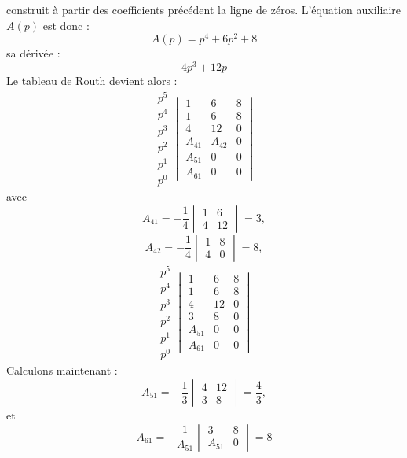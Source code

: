 construit à partir des coefficients précédent la ligne de zéros.
L'équation auxiliaire $A(p)$ est donc :
\[
A(p)=p^4+6p^2+8
\]
sa dérivée :
\[
4p^3+12p
\]
Le tableau de Routh devient alors :
\[
\begin{matrix}
    p^5 \\[1em]
    p^4 \\[1em]
    \hline
    p^3 \\[1em]
    p^2 \\[1em]
    p^1 \\[1em]
    p^0 
\end{matrix}
\begin{vmatrix}
    1  & 6   & 8 \\[1em]
    1  & 6   & 8 \\[1em] 
    \hline
    4 & 12 & 0\\[1em]
    A_{41} & A_{42} & 0\\[1em]
    A_{51} & 0      & 0\\[1em]
    A_{61} & 0 & 0
\end{vmatrix}
\]
avec 
\[
A_{41}=-\dfrac{1}{4}\begin{vmatrix}1 & 6 \\ 4& 12\end{vmatrix}=3, 
\]
\[
A_{42}=-\dfrac{1}{4}\begin{vmatrix}1 & 8 \\ 4& 0\end{vmatrix}=8,
\]
\[
\begin{matrix}
    p^5 \\[1em]
    p^4 \\[1em]
    \hline
    p^3 \\[1em]
    p^2 \\[1em]
    p^1 \\[1em]
    p^0 
\end{matrix}
\begin{vmatrix}
    1  & 6   & 8 \\[1em]
    1  & 6   & 8 \\[1em] 
    \hline
    4 & 12 & 0\\[1em]
    3 & 8 & 0\\[1em]
    A_{51} & 0      & 0\\[1em]
    A_{61} & 0 & 0
\end{vmatrix}
\]
Calculons maintenant :
\[
A_{51}=-\dfrac{1}{3}\begin{vmatrix}4 & 12 \\ 3& 8\end{vmatrix}=\dfrac{4}{3},
\]
et
\[
A_{61}=-\dfrac{1}{A_{51}}\begin{vmatrix}3 & 8 \\ A_{51}& 0\end{vmatrix}=8
\]
